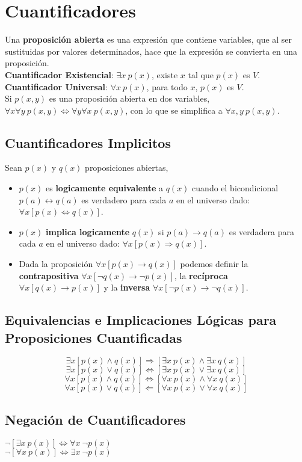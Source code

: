 \documentclass[11pt,a4paper]{article}
\begin{document}
\section{Cuantificadores}
\noindent Una \textbf{proposición abierta} es una expresi\'on que contiene variables, que al ser sustituidas por valores determinados, hace que la expresión se convierta en una proposición.\\

\noindent \textbf{Cuantificador Existencial}: $\exists x\ p(x)$, existe $x$ tal que $p(x)$ es $V$.\\
\noindent \textbf{Cuantificador Universal}: $\forall x\ p(x)$, para todo $x$, $p(x)$ es $V$.\\

\noindent Si $p(x,y)$ es una proposici\'on abierta en dos variables, $\forall x \forall y\ p(x,y) \Leftrightarrow \forall y \forall x\ p(x,y)$, con lo que se simplifica a $\forall x, y\ p(x,y)$.

\subsection{Cuantificadores Implicitos}
\noindent Sean $p(x)$ y $q(x)$ proposiciones abiertas, 
\begin{itemize}
\item $p(x)$ es \textbf{logicamente equivalente} a $q(x)$ cuando el bicondicional $p(a) \leftrightarrow q(a)$ es verdadero para cada $a$ en el universo dado: $\forall x [p(x) \Leftrightarrow q(x)]$.
\item $p(x)$ \textbf{implica logicamente} $q(x)$ si $p(a) \rightarrow q(a)$ es verdadera para cada $a$ en el universo dado: $\forall x [p(x)\Rightarrow q(x)]$.
\item Dada la proposici\'on $\forall x [p(x) \rightarrow q(x)]$ podemos definir la \textbf{contrapositiva} $\forall x [\lnot q(x) \rightarrow \lnot p(x)]$, la \textbf{rec\'iproca} $\forall x [q(x) \rightarrow p(x)]$ y la \textbf{inversa} $\forall x [\lnot p(x) \rightarrow \lnot q(x)]$.
\end{itemize}

\subsection{Equivalencias e Implicaciones L\'ogicas para Proposiciones Cuantificadas}
$$\exists x [p(x) \land q(x)] \Rightarrow [\exists x\ p(x) \land \exists x\ q(x)]$$
$$\exists x [p(x) \lor q(x)] \Leftrightarrow [\exists x\ p(x) \lor \exists x\ q(x)]$$
$$\forall x [p(x) \land q(x)] \Leftrightarrow [\forall x\ p(x) \land \forall x\ q(x)]$$
$$\forall x [p(x) \lor q(x)] \Leftarrow [\forall x\ p(x) \lor \forall x\ q(x)]$$

\subsection{Negaci\'on de Cuantificadores}
\begin{multicols}{2}
\quad \quad \quad \quad \quad $\lnot[\exists x\ p(x)] \Leftrightarrow \forall x\ \lnot p(x)$\\
\quad \quad \quad \quad \quad $\lnot[\forall x\ p(x)] \Leftrightarrow \exists x\ \lnot p(x)$
\end{multicols}
\end{document}
